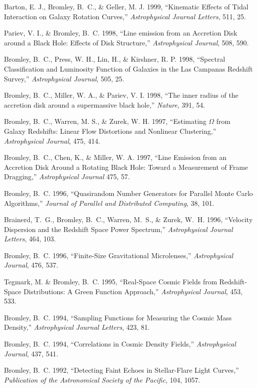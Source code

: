 \documentclass[11pt]{article}
\def\refitem{} %
\begin{document}
\refitem Barton, E. J., Bromley, B.~C., \& Geller, M. J. 1999,
``Kinematic Effects of Tidal Interaction on Galaxy Rotation Curves,''
         {\em Astrophysical Journal Letters}, 511, 25.

\refitem Pariev, V. I., \& Bromley, B.~C. 1998, ``Line emission from
an Accretion Disk around a Black Hole: Effects of Disk Structure,''
{\em Astrophysical Journal}, 508, 590.

\refitem Bromley, B.~C., Press, W. H., Lin, H., \& Kirshner, R. P.
1998, ``Spectral Classification and Luminosity Function of Galaxies in
the Las Campanas Redshift Survey,'' {\em Astrophysical Journal}, 505,
25.

\refitem Bromley, B.~C., Miller, W. A., \& Pariev, V. I. 1998, ``The
inner radius of the accretion disk around a supermassive black hole,''
{\em Nature}, 391, 54.

\refitem Bromley, B.~C., Warren, M. S., \& Zurek, W. H. 1997,
``Estimating $\Omega$ from Galaxy Redshifts: Linear Flow Distortions
and Nonlinear Clustering,'' {\em Astrophysical Journal}, 475, 414.

\refitem Bromley, B.~C., Chen, K., \& Miller, W. A. 1997, ``Line
Emission from an Accretion Disk Around a Rotating Black Hole: Toward a
Measurement of Frame Dragging,'' {\em Astrophysical Journal} 475, 57.

\refitem Bromley, B.\ C. 1996, ``Quasirandom Number Generators for
Parallel Monte Carlo Algorithms,'' {\em Journal of Parallel and
  Distributed Computing}, 38, 101.

\refitem Brainerd, T.\ G., Bromley, B.\ C., Warren, M.\ S., \& Zurek,
W.\ H. 1996, ``Velocity Dispersion and the Redshift Space Power
Spectrum,'' {\em Astrophysical Journal Letters}, 464, 103.


\refitem Bromley, B.\ C. 1996, ``Finite-Size Gravitational
Microlenses,'' {\em Astrophysical Journal}, 476, 537.


\refitem Tegmark, M. \& Bromley, B.\ C. 1995, ``Real-Space Cosmic
Fields from Redshift-Space Distributions: A Green Function Approach,''
{\em Astrophysical Journal}, 453, 533.

\refitem Bromley, B.\ C. 1994, ``Sampling Functions for Measuring the
Cosmic Mass Density,'' {\em Astrophysical Journal Letters}, 423, 81.

\refitem Bromley, B.\ C. 1994, ``Correlations in Cosmic Density
Fields,'' {\em Astrophysical Journal}, 437, 541.

\refitem Bromley, B.\ C. 1992, ``Detecting Faint Echoes in
Stellar-Flare Light Curves,'' {\em Publication of the Astronomical
  Society of the Pacific}, 104, 1057.
\end{document}
